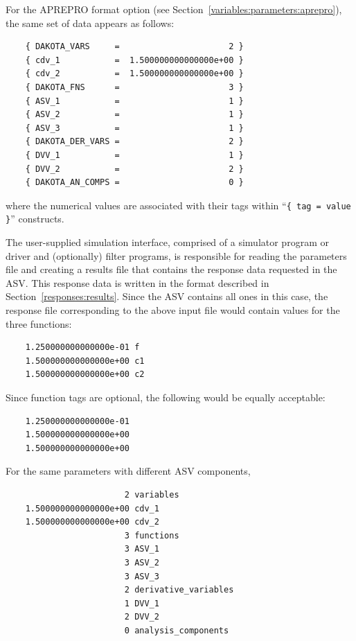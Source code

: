For the APREPRO format option (see
Section~\ref{variables:parameters:aprepro}), the same set of data
appears as follows:
\begin{small}
\begin{verbatim}
    { DAKOTA_VARS     =                      2 }
    { cdv_1           =  1.500000000000000e+00 }
    { cdv_2           =  1.500000000000000e+00 }
    { DAKOTA_FNS      =                      3 }
    { ASV_1           =                      1 }
    { ASV_2           =                      1 }
    { ASV_3           =                      1 }
    { DAKOTA_DER_VARS =                      2 }
    { DVV_1           =                      1 }
    { DVV_2           =                      2 }
    { DAKOTA_AN_COMPS =                      0 }
\end{verbatim}
\end{small}

where the numerical values are associated with their tags within
``\texttt{\{ tag = value \}}'' constructs.

The user-supplied simulation interface, comprised of a simulator
program or driver and (optionally) filter programs, is responsible for
reading the parameters file and creating a results file that contains
the response data requested in the ASV. This response data is written
in the format described in Section~\ref{responses:results}. Since the
ASV contains all ones in this case, the response file corresponding to
the above input file would contain values for the three functions:
\begin{small}
\begin{verbatim}
    1.250000000000000e-01 f
    1.500000000000000e+00 c1
    1.500000000000000e+00 c2
\end{verbatim}
\end{small}

Since function tags are optional, the following would be equally
acceptable:
\begin{small}
\begin{verbatim}
    1.250000000000000e-01
    1.500000000000000e+00
    1.500000000000000e+00
\end{verbatim}
\end{small}

For the same parameters with different ASV components,
\begin{small}
\begin{verbatim}
                        2 variables
    1.500000000000000e+00 cdv_1
    1.500000000000000e+00 cdv_2
                        3 functions
                        3 ASV_1
                        3 ASV_2
                        3 ASV_3
                        2 derivative_variables
                        1 DVV_1
                        2 DVV_2
                        0 analysis_components
\end{verbatim}
\end{small}

